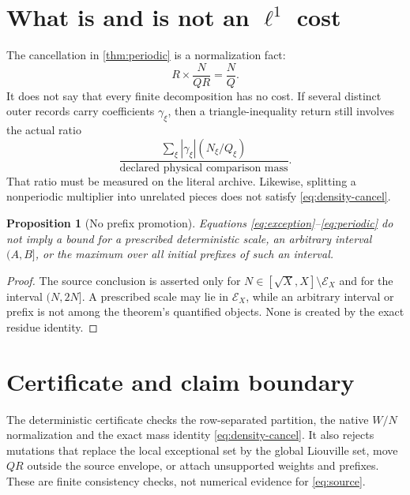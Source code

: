 \documentclass[11pt]{article}
\newtheorem{proposition}[theorem]{Proposition}
\theoremstyle{definition}
\theoremstyle{remark}
\begin{document}
\section{What is and is not an \texorpdfstring{\(\ell^1\)}{l1} cost}

The cancellation in \cref{thm:periodic} is a normalization fact:
\begin{equation}
 R\times\frac{N}{QR}=\frac NQ.
\label{eq:density-cancel}
\end{equation}
It does not say that every finite decomposition has no cost.  If
several distinct outer records carry coefficients \(\gamma_\xi\),
then a triangle-inequality return still involves the actual ratio
\[
 \frac{
 \sum_\xi|\gamma_\xi|(N_\xi/Q_\xi)
 }{\text{declared physical comparison mass}}.
\]
That ratio must be measured on the literal archive.  Likewise,
splitting a nonperiodic multiplier into unrelated pieces does not
satisfy \eqref{eq:density-cancel}.

\begin{proposition}[No prefix promotion]
\label{prop:no-prefix}
Equations \eqref{eq:exception}--\eqref{eq:periodic} do not imply a
bound for a prescribed deterministic scale, an arbitrary interval
\((A,B]\), or the maximum over all initial prefixes of such an
interval.
\end{proposition}

\begin{proof}
The source conclusion is asserted only for
\(N\in[\sqrt X,X]\setminus\mathcal E_X\) and for the interval
\((N,2N]\).  A prescribed scale may lie in \(\mathcal E_X\), while an
arbitrary interval or prefix is not among the theorem's quantified
objects.  None is created by the exact residue identity.
\end{proof}

\section{Certificate and claim boundary}

The deterministic certificate checks the row-separated partition,
the native \(W/N\) normalization and the exact mass identity
\eqref{eq:density-cancel}.  It also rejects mutations that replace
the local exceptional set by the global Liouville set, move \(QR\)
outside the source envelope, or attach unsupported weights and
prefixes.  These are finite consistency checks, not numerical
evidence for \eqref{eq:source}.
\end{document}
